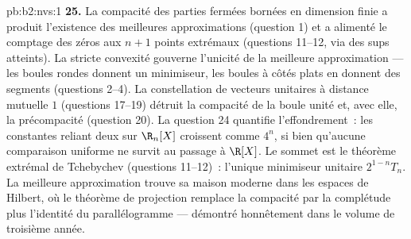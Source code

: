 \begin{solution}{pb:b2:nvs:1}
\textbf{25.} La compacité des parties fermées bornées en dimension
finie a produit l'existence des meilleures approximations (question
1) et a alimenté le comptage des zéros aux $n + 1$ points extrémaux
(questions 11--12, via des sups atteints). La stricte convexité gouverne
l'unicité de la meilleure approximation --- les boules rondes donnent un
minimiseur, les boules à côtés plats en donnent des segments (questions
2--4). La constellation de vecteurs unitaires à distance mutuelle
$1$ (questions 17--19) détruit la compacité de la boule unité
et, avec elle, la précompacité (question 20). La question 24
quantifie l'effondrement~: les constantes reliant deux  sur
$\R_n[X]$ croissent comme $4^n$, si bien qu'aucune comparaison uniforme
ne survit au passage à $\R[X]$. Le sommet est le théorème extrémal de
Tchebychev (questions 11--12)~: l'unique minimiseur unitaire
$2^{1-n}T_n$. La meilleure approximation trouve sa maison moderne dans
les espaces de Hilbert, où le théorème de projection remplace
la compacité par la complétude plus l'identité du parallélogramme ---
démontré honnêtement dans le volume de troisième année.
\end{solution}

